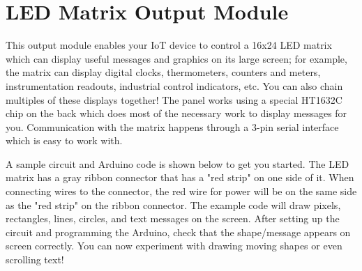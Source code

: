 
\clearpage
\section{LED Matrix Output Module}
\label{sec-output-ledmatrix}

This output module enables your IoT device to control a 16x24 LED matrix
which can display useful messages and graphics on its large screen; for
example, the matrix can display digital clocks, thermometers, counters
and meters, instrumentation readouts, industrial control indicators,
etc. You can also chain multiples of these displays together! The panel
works using a special HT1632C chip on the back which does most of the
necessary work to display messages for you. Communication with the
matrix happens through a 3-pin serial interface which is easy to work
with.

A sample circuit and Arduino code is shown below to get you started.
The LED matrix has a gray ribbon connector that has a "red strip" on one
side of it. When connecting wires to the connector, the red wire for
power will be on the same side as the "red strip" on the ribbon
connector. The example code will draw pixels, rectangles, lines,
circles, and text messages on the screen. After setting up the circuit
and programming the Arduino, check that the shape/message appears on
screen correctly. You can now experiment with drawing moving shapes or
even scrolling text!

